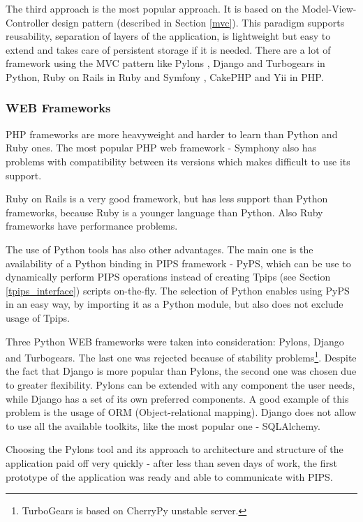 The third approach is the most popular approach. It is based on the
Model-View-Controller design pattern (described in Section
\ref{mvc}). This paradigm supports reusability, separation of layers
of the application, is lightweight but easy to extend and takes care
of persistent storage if it is needed. There are a lot of framework
using the MVC pattern like Pylons \cite{pylons}, Django \cite{django}
and Turbogears \cite{turbogears} in Python, Ruby on Rails
\cite{rubyonrails} in Ruby and Symfony \cite{symfony}, CakePHP
\cite{cakephp} and Yii \cite{yii} in PHP.

\subsubsection{WEB Frameworks}

PHP frameworks are more heavyweight and harder to learn than Python
and Ruby ones. The most popular PHP web framework - Symphony also has
problems with compatibility between its versions which makes difficult
to use its support.

Ruby on Rails is a very good framework, but has less support than
Python frameworks, because Ruby is a younger language than
Python. Also Ruby frameworks have performance problems.

The use of Python tools has also other advantages. The main one is the
availability of a Python binding in PIPS framework - PyPS, which can
be use to dynamically perform PIPS operations instead of creating
Tpips (see Section \ref{tpips_interface}) scripts on-the-fly. The
selection of Python enables using PyPS in an easy way, by importing it as
a Python module, but also does not exclude usage of Tpips.

Three Python WEB frameworks were taken into consideration: Pylons,
Django and Turbogears. The last one was rejected because of stability
problems\footnote{TurboGears is based on CherryPy \cite{cherrypy}
  unstable server.}. Despite the fact that Django is more popular than
Pylons, the second one was chosen due to greater flexibility. Pylons
can be extended with any component the user needs, while Django has a
set of its own preferred components. A good example of this problem is
the usage of ORM (Object-relational mapping\cite{orm}). Django does
not allow to use all the available toolkits, like the most popular
one - SQLAlchemy\cite{sqlalchemy}.

Choosing the Pylons tool and its approach to architecture and
structure of the application paid off very quickly - after less than
seven days of work, the first prototype of the application was ready
and able to communicate with PIPS.

